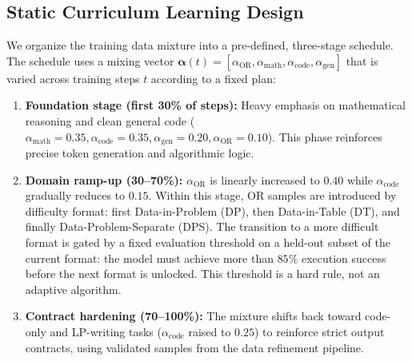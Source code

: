 


\subsection{Static Curriculum Learning Design}

We organize the training data mixture into a pre-defined, three-stage schedule. The schedule uses a mixing vector \(\bm{\alpha}(t) = [\alpha_{\text{OR}}, \alpha_{\text{math}}, \alpha_{\text{code}}, \alpha_{\text{gen}}]\) that is varied across training steps \(t\) according to a fixed plan:

\begin{enumerate}
    \item \textbf{Foundation stage (first 30\% of steps):} Heavy emphasis on mathematical reasoning and clean general code (\(\alpha_{\text{math}}=0.35, \alpha_{\text{code}}=0.35, \alpha_{\text{gen}}=0.20, \alpha_{\text{OR}}=0.10\)). This phase reinforces precise token generation and algorithmic logic.

    \item \textbf{Domain ramp-up (30--70\%):} \(\alpha_{\text{OR}}\) is linearly increased to \(0.40\) while \(\alpha_{\text{code}}\) gradually reduces to \(0.15\). Within this stage, OR samples are introduced by difficulty format: first Data-in-Problem (DP), then Data-in-Table (DT), and finally Data-Problem-Separate (DPS). The transition to a more difficult format is gated by a fixed evaluation threshold on a held-out subset of the current format: the model must achieve more than \(85\%\) execution success before the next format is unlocked. This threshold is a hard rule, not an adaptive algorithm.

    \item \textbf{Contract hardening (70--100\%):} The mixture shifts back toward code-only and LP-writing tasks (\(\alpha_{\text{code}}\) raised to \(0.25\)) to reinforce strict output contracts, using validated samples from the data refinement pipeline.
\end{enumerate}

